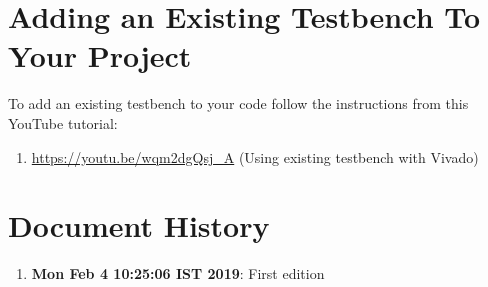 \documentclass[a4paper,10pt]{article}
\theoremstyle{mytheor}
\begin{document}
\section*{Adding an Existing Testbench To Your Project}
To add an existing testbench to your code follow the instructions from
this YouTube tutorial:

\begin{enumerate} \item[] \url{https://youtu.be/wqm2dgQsj_A} (Using
  existing testbench with Vivado) \end{enumerate}

\section*{Document History}
\begin{enumerate}
\item \textbf{Mon Feb  4 10:25:06 IST 2019}: First edition

\end{enumerate}
\end{document}
